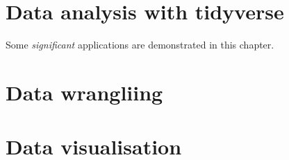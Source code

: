 \documentclass[
]{book}
\begin{document}
\hypertarget{data-analysis-with-tidyverse}{%
\chapter{Data analysis with tidyverse}\label{data-analysis-with-tidyverse}}

Some \emph{significant} applications are demonstrated in this chapter.

\hypertarget{data-wrangliing}{%
\chapter{Data wrangliing}\label{data-wrangliing}}

\hypertarget{data-visualisation}{%
\chapter{Data visualisation}\label{data-visualisation}}

  
\end{document}
